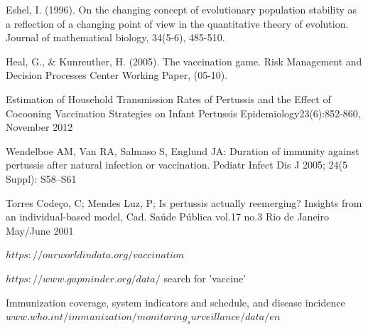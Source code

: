 \documentclass[11pt]{article}
\begin{document}
Eshel, I. (1996). On the changing concept of evolutionary population stability as a reflection of a changing point of view in the quantitative theory of evolution. Journal of mathematical biology, 34(5-6), 485-510.
\vspace{14px}

Heal, G., \& Kunreuther, H. (2005). The vaccination game. Risk Management and Decision Processes Center Working Paper, (05-10). 
\vspace{14px}

Estimation of Household Transmission Rates of Pertussis and the Effect of Cocooning Vaccination Strategies on Infant Pertussis Epidemiology23(6):852-860, November 2012

Wendelboe AM, Van RA, Salmaso S, Englund JA: Duration of immunity against pertussis after natural infection or vaccination. Pediatr Infect Dis J 2005; 24(5 Suppl): S58–S61

Torres Codeço, C; Mendes Luz, P; Is pertussis actually reemerging? Insights from an individual-based model, Cad. Saúde Pública vol.17 no.3 Rio de Janeiro May/June 2001
\vspace{14px}

$https://ourworldindata.org/vaccination$ 
\vspace{14px}

$https://www.gapminder.org/data/$ search for 'vaccine'
\vspace{14px}

Immunization coverage, system indicators and schedule, and disease incidence $www.who.int/immunization/monitoring_surveillance/data/en$


\newpage
\end{document}
